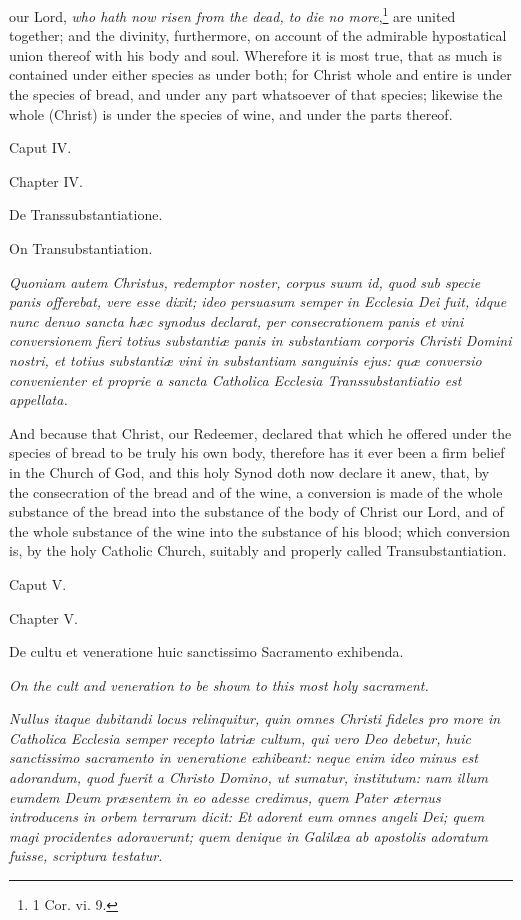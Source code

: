 our Lord, \emph{who hath now risen from the dead, to die no more},\footnote{\par   1 Cor. vi. 9.} are united together; and the divinity, furthermore, on account of the admirable hypostatical union thereof with his body and soul. Wherefore it is most true, that as much is contained under either species as under both; for Christ whole and entire is under the species of bread, and under any part whatsoever of that species; likewise the whole (Christ) is under the species of wine, and under the parts thereof.

Caput IV.

Chapter IV.

De Transsubstantiatione.

On Transubstantiation.

\emph{Quoniam autem Christus, redemptor noster, corpus suum id, quod sub specie panis offerebat, vere esse dixit; ideo persuasum semper in Ecclesia Dei fuit, idque nunc denuo sancta hæc synodus declarat, per consecrationem panis et vini conversionem fieri totius substantiæ panis in substantiam corporis Christi Domini nostri, et totius substantiæ vini in substantiam sanguinis ejus: quæ conversio convenienter et proprie a sancta Catholica Ecclesia Transsubstantiatio est appellata.}

And because that Christ, our Redeemer, declared that which he offered under the species of bread to be truly his own body, therefore has it ever been a firm belief in the Church of God, and this holy Synod doth now declare it anew, that, by the consecration of the bread and of the wine, a conversion is made of the whole substance of the bread into the substance of the body of Christ our Lord, and of the whole substance of the wine into the substance of his blood; which conversion is, by the holy Catholic Church, suitably and properly called Transubstantiation.

Caput V.

Chapter V.

De cultu et veneratione huic sanctissimo Sacramento exhibenda.

\emph{On the cult and veneration to be shown to this most holy sacrament.}

\emph{Nullus itaque dubitandi locus relinquitur, quin omnes Christi fideles pro more in Catholica Ecclesia semper recepto latriæ cultum, qui vero Deo debetur, huic sanctissimo sacramento in veneratione exhibeant: neque enim ideo minus est adorandum, quod fuerit a Christo Domino, ut sumatur, institutum: nam illum eumdem Deum præsentem in eo adesse credimus, quem Pater æternus introducens in orbem terrarum dicit: Et adorent eum omnes angeli Dei; quem magi procidentes adoraverunt; quem denique in Galilæa ab apostolis adoratum fuisse, scriptura testatur.}


